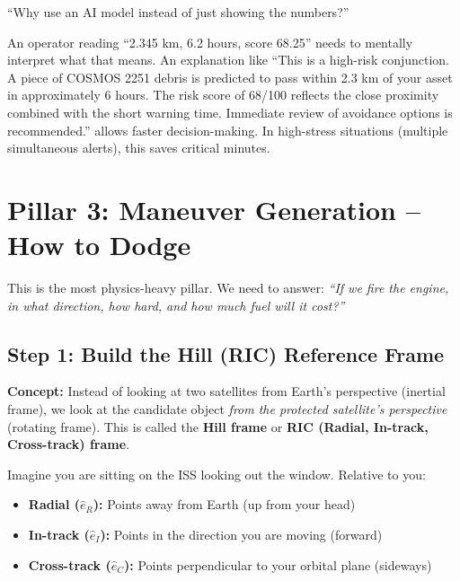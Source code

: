 \documentclass[12pt,a4paper]{article}
\begin{document}
\begin{questionbox}
``Why use an AI model instead of just showing the numbers?''
\end{questionbox}
\begin{answerbox}
An operator reading ``2.345 km, 6.2 hours, score 68.25'' needs to mentally interpret what that means. An explanation like ``This is a high-risk conjunction. A piece of COSMOS 2251 debris is predicted to pass within 2.3 km of your asset in approximately 6 hours. The risk score of 68/100 reflects the close proximity combined with the short warning time. Immediate review of avoidance options is recommended.'' allows faster decision-making. In high-stress situations (multiple simultaneous alerts), this saves critical minutes.
\end{answerbox}

\newpage
\section{Pillar 3: Maneuver Generation -- How to Dodge}

This is the most physics-heavy pillar. We need to answer: \textit{``If we fire the engine, in what direction, how hard, and how much fuel will it cost?''}

\subsection{Step 1: Build the Hill (RIC) Reference Frame}

\textbf{Concept:} Instead of looking at two satellites from Earth's perspective (inertial frame), we look at the candidate object \textit{from the protected satellite's perspective} (rotating frame). This is called the \textbf{Hill frame} or \textbf{RIC (Radial, In-track, Cross-track) frame}.

Imagine you are sitting on the ISS looking out the window. Relative to you:
\begin{itemize}
    \item \textbf{Radial ($\hat{e}_R$):} Points away from Earth (up from your head)
    \item \textbf{In-track ($\hat{e}_I$):} Points in the direction you are moving (forward)
    \item \textbf{Cross-track ($\hat{e}_C$):} Points perpendicular to your orbital plane (sideways)
\end{itemize}
\end{document}
